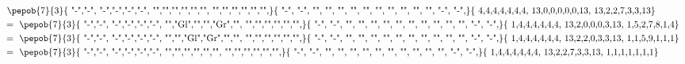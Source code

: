 \begin{equation}
    \begin{split}
        & \vcenter{ \hbox{ \pepob{7}{3}{{
                            "-","-", "-","-","-","-",
                            "","","","","","",
                            "","","","","","",}}{{
                            "-", "-",
                            "", "",
                            "", "",
                            "", "",
                            "", "",
                            "", "",
                            "-", "-",}}{{
                            4,4,4,4,4,4,4,
                            13,0,0,0,0,0,13,
                            13,2,2,7,3,3,13}} }}\\
        &=       \vcenter{ \hbox{ \pepob{7}{3}{{
                            "-","-", "-","-","-","-",
                            "","Gl","","","Gr","",
                            "","","","","","",}}{{
                            "-", "-",
                            "", "",
                            "", "",
                            "", "",
                            "", "",
                            "", "",
                            "-", "-",}}{{
                            1,4,4,4,4,4,4,
                            13,2,0,0,0,3,13,
                            1,5,2,7,8,1,4}}}} \\
        &=  \vcenter{ \hbox{ \pepob{7}{3}{{
                            "-","-", "-","-","-","-",
                            "","","Gl","Gr","","",
                            "","","","","","",}}{{
                            "-", "-",
                            "", "",
                            "", "",
                            "", "",
                            "", "",
                            "", "",
                            "-", "-",}}{{
                            1,4,4,4,4,4,4,
                            13,2,2,0,3,3,13,
                            1,1,5,9,1,1,1}} }}\\
        &= \vcenter{ \hbox{ \pepob{7}{3}{{
                            "-","-", "-","-","-","-",
                            "","","","","","",
                            "","","","","","",}}{{
                            "-", "-",
                            "", "",
                            "", "",
                            "", "",
                            "", "",
                            "", "",
                            "-", "-",}}{{
                            1,4,4,4,4,4,4,
                            13,2,2,7,3,3,13,
                            1,1,1,1,1,1,1}} }}
    \end{split}
\end{equation}

